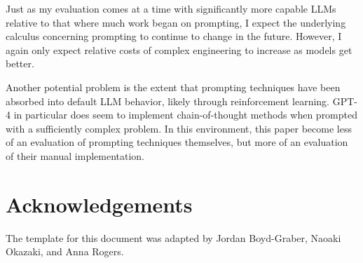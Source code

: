 \documentclass[11pt]{article}
\begin{document}
Just as my evaluation comes at a time with significantly more capable LLMs relative to that where much work began on prompting, I expect the underlying calculus concerning prompting to continue to change in the future. However, I again only expect relative costs of complex engineering to increase as models get better.

Another potential problem is the extent that prompting techniques have been absorbed into default LLM behavior, likely through reinforcement learning. GPT-4 in particular does seem to implement chain-of-thought methods when prompted with a sufficiently complex problem. In this environment, this paper become less of an evaluation of prompting techniques themselves, but more of an evaluation of their manual implementation.

\section*{Acknowledgements}
The template for this document was adapted by Jordan Boyd-Graber, Naoaki Okazaki, and Anna Rogers.



\end{document}
